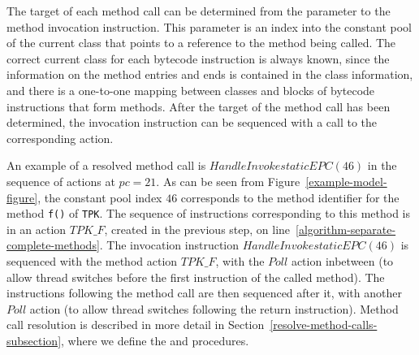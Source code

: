 The target of each method call can be determined from the parameter to
the method invocation instruction.
This parameter is an index into the constant pool of the current class
that points to a reference to the method being called.
The correct current class for each bytecode instruction is always
known, since the information on the method entries and ends is
contained in the class information, and there is a one-to-one mapping
between classes and blocks of bytecode instructions that form methods.
After the target of the method call has been determined, the
invocation instruction can be sequenced with a call to the
corresponding \Circus{} action.

An example of a resolved method call is $HandleInvokestaticEPC(46)$ in
the sequence of actions at $pc = 21$.
As can be seen from Figure~\ref{example-model-figure}, the constant
pool index $46$ corresponds to the method identifier for the method
\texttt{f()} of \texttt{TPK}.
The sequence of instructions corresponding to this method is in an
action $TPK\_F$, created in the previous step, on
line~\ref{algorithm-separate-complete-methods}.
The invocation instruction $HandleInvokestaticEPC(46)$ is sequenced
with the method action $TPK\_F$, with the $Poll$ action inbetween (to
allow thread switches before the first instruction of the called
method).
The instructions following the method call are then sequenced after
it, with another $Poll$ action (to allow thread switches following the
return instruction).
Method call resolution is described in more detail in
Section~\ref{resolve-method-calls-subsection}, where we define the
 and 
procedures.

